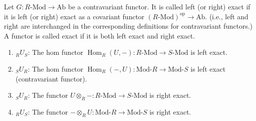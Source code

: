 \documentclass[11pt, a4paper]{report}
\begin{document}
Let $G: R\text{-}\mathrm{Mod} \rightarrow \mathrm{Ab}$ be a contravariant functor. It is called left (or right) exact if it is left (or right) exact as a covariant functor $(R\text{-}\mathrm{Mod})^{\mathrm{op}} \rightarrow \mathrm{Ab}$. (i.e., left and right are interchanged in the corresponding definitions for contravariant functors.) A functor is called exact if it is both left exact and right exact.

\begin{theorem}
\begin{enumerate}
\item ${}_{R}U_{S}$: The hom functor $\operatorname{Hom}_{R}(U,-): R\text{-}\mathrm{Mod} \rightarrow S\text{-}\mathrm{Mod}$ is left exact.
\item ${}_{S}U_{R}$: The hom functor $\operatorname{Hom}_{R}(-, U): \mathrm{Mod}\text{-}R \rightarrow \mathrm{Mod}\text{-}S$ is left exact (contravariant functor).
\item ${}_{S}U_{R}$: The functor $U \otimes_{R}-: R\text{-}\mathrm{Mod} \rightarrow S\text{-}\mathrm{Mod}$ is right exact.
\item ${}_{R}U_{S}$: The functor $-\otimes_{R} U: \mathrm{Mod}\text{-}R \rightarrow \mathrm{Mod}\text{-}S$ is right exact.
\end{enumerate}
\end{theorem}
\end{document}
